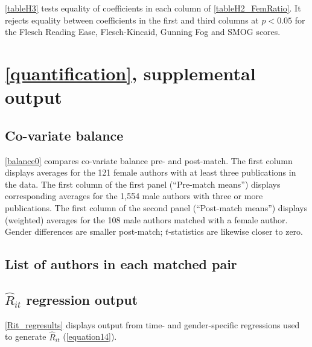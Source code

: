 \begin{appendices}
\begin{refsection}
\autoref{tableH3} tests equality of coefficients in each column of \autoref{tableH2_FemRatio}. It rejects equality between coefficients in the first and third columns at $p<0.05$ for the Flesch Reading Ease, Flesch-Kincaid, Gunning Fog and SMOG scores.



\clearpage


\section{\autoref{quantification}, supplemental output}
\label{appendixquantification}

\subsection{Co-variate balance}
\label{appendixmatchingbalance}

\autoref{balance0} compares co-variate balance pre- and post-match. The first column displays averages for the 121 female authors with at least three publications in the data. The first column of the first panel (``Pre-match means'') displays corresponding averages for the 1,554 male authors with three or more publications. The first column of the second panel (``Post-match means'') displays (weighted) averages for the 108 male authors matched with a female author. Gender differences are smaller post-match; $t$-statistics are likewise closer to zero.



\clearpage


\subsection{List of authors in each matched pair}
\label{appendixmatchingnames}



\clearpage


\subsection{$\widehat R_{it}$ regression output}
\label{appendixreconstruction}

\autoref{Rit_regresults} displays output from time- and gender-specific regressions used to generate $\widehat R_{it}$ (\autoref{equation14}).



\clearpage



\end{refsection}
\end{appendices}
